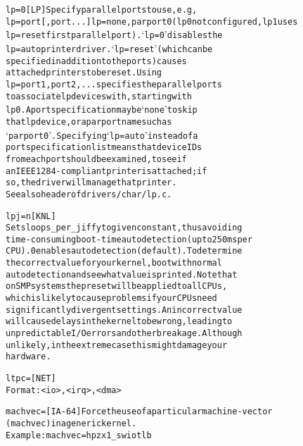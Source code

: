 \documentclass[a4paper,8pt,english]{sphinxmanual}
\begin{document}
\begin{alltt}
        lp=0            {[}LP{]}    Specify parallel ports to use, e.g,
        lp=port{[},port...{]}       lp=none,parport0 (lp0 not configured, lp1 uses
        lp=reset                first parallel port). `lp=0' disables the
        lp=auto                 printer driver. `lp=reset' (which can be
                                specified in addition to the ports) causes
                                attached printers to be reset. Using
                                lp=port1,port2,... specifies the parallel ports
                                to associate lp devices with, starting with
                                lp0. A port specification may be `none' to skip
                                that lp device, or a parport name such as
                                `parport0'. Specifying `lp=auto' instead of a
                                port specification list means that device IDs
                                from each port should be examined, to see if
                                an IEEE 1284-compliant printer is attached; if
                                so, the driver will manage that printer.
                                See also header of drivers/char/lp.c.

        lpj=n           {[}KNL{]}
                        Sets loops\_per\_jiffy to given constant, thus avoiding
                        time-consuming boot-time autodetection (up to 250 ms per
                        CPU). 0 enables autodetection (default). To determine
                        the correct value for your kernel, boot with normal
                        autodetection and see what value is printed. Note that
                        on SMP systems the preset will be applied to all CPUs,
                        which is likely to cause problems if your CPUs need
                        significantly divergent settings. An incorrect value
                        will cause delays in the kernel to be wrong, leading to
                        unpredictable I/O errors and other breakage. Although
                        unlikely, in the extreme case this might damage your
                        hardware.

        ltpc=           {[}NET{]}
                        Format: \textless{}io\textgreater{},\textless{}irq\textgreater{},\textless{}dma\textgreater{}

        machvec=        {[}IA-64{]} Force the use of a particular machine-vector
                        (machvec) in a generic kernel.
                        Example: machvec=hpzx1\_swiotlb


\end{alltt}
\end{document}
